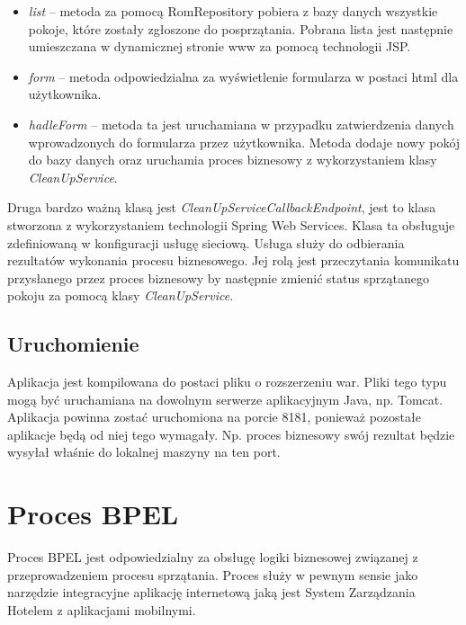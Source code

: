 \begin{itemize}
\item \textit{list} -- metoda za pomocą RomRepository pobiera z bazy danych wszystkie pokoje, które zostały zgłoszone do posprzątania. Pobrana lista jest  następnie umieszczana w dynamicznej stronie www za pomocą technologii JSP. 
\item \textit{form} -- metoda odpowiedzialna za wyświetlenie formularza w postaci html dla użytkownika. 
\item \textit{hadleForm} -- metoda ta jest uruchamiana w przypadku zatwierdzenia danych wprowadzonych do formularza przez użytkownika. Metoda dodaje nowy pokój do bazy danych oraz uruchamia proces biznesowy z wykorzystaniem klasy \textit{CleanUpService}. 
\end{itemize}

Druga bardzo ważną klasą jest \textit{CleanUpServiceCallbackEndpoint}, jest to klasa stworzona z wykorzystaniem technologii Spring Web Services. Klasa ta obsługuje zdefiniowaną w konfiguracji usługę sieciową. Usługa służy do odbierania rezultatów wykonania procesu biznesowego. Jej rolą jest przeczytania komunikatu przysłanego przez proces biznesowy by następnie zmienić status sprzątanego pokoju za pomocą klasy \textit{CleanUpService}. 

\subsection{Uruchomienie}

Aplikacja jest kompilowana do postaci pliku o rozszerzeniu war. Pliki tego typu mogą być uruchamiana na dowolnym serwerze aplikacyjnym Java, np. Tomcat. Aplikacja powinna zostać uruchomiona na porcie 8181, ponieważ pozostałe aplikacje będą od niej tego wymagały. Np. proces biznesowy swój rezultat będzie wysyłał właśnie do lokalnej maszyny na ten port. 


\section{Proces BPEL }
\label{sec:exampleBPEL}

Proces BPEL jest odpowiedzialny za obsługę logiki biznesowej związanej z przeprowadzeniem procesu sprzątania. Proces służy w pewnym sensie jako narzędzie integracyjne aplikację internetową jaką jest System Zarządzania Hotelem z aplikacjami mobilnymi. 

